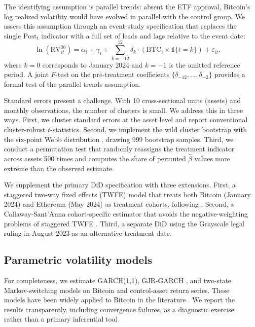 \documentclass[12pt,a4paper]{article}
\begin{document}
The identifying assumption is parallel trends: absent the ETF approval,
Bitcoin's log realized volatility would have evolved in parallel with the
control group. We assess this assumption through an event-study
specification that replaces the single $\text{Post}_t$ indicator with a
full set of leads and lags relative to the event date:
\begin{equation}\label{eq:eventstudy}
  \ln(\text{RV}^{30}_{it}) = \alpha_i + \gamma_t + \sum_{k=-12}^{12}
  \delta_k \cdot (\text{BTC}_i \times \mathbb{1}\{t = k\}) + \varepsilon_{it},
\end{equation}
where $k = 0$ corresponds to January 2024 and $k = -1$ is the omitted
reference period. A joint $F$-test on the pre-treatment coefficients
$\{\delta_{-12}, \ldots, \delta_{-2}\}$ provides a formal test of the
parallel trends assumption.

Standard errors present a challenge. With 10 cross-sectional units (assets)
and monthly observations, the number of clusters is small. We address this
in three ways. First, we cluster standard errors at the asset level and
report conventional cluster-robust $t$-statistics. Second, we implement
the wild cluster bootstrap with the six-point Webb distribution
\citep{cameron2008bootstrap, webb2022wild}, drawing 999 bootstrap samples.
Third, we conduct a permutation test that randomly reassigns the treatment
indicator across assets 500 times and computes the share of permuted
$\hat{\beta}$ values more extreme than the observed estimate.

We supplement the primary DiD specification with three extensions. First, a
staggered two-way fixed effects (TWFE) model that treats both Bitcoin
(January 2024) and Ethereum (May 2024) as treatment cohorts, following
\citet{goodmanbacon2021difference}. Second, a Callaway-Sant'Anna
cohort-specific estimator that avoids the negative-weighting problems of
staggered TWFE \citep{callaway2021difference}. Third, a separate DiD using
the Grayscale legal ruling in August 2023 as an alternative treatment date.

\subsection{Parametric volatility models}\label{sec:meth-garch}

For completeness, we estimate GARCH(1,1), GJR-GARCH \citep{glosten1993relation},
and two-state Markov-switching \citep{hamilton1989new} models on Bitcoin
and control-asset return series. These models have been widely applied to
Bitcoin in the literature \citep{katsiampa2017volatility,
ardia2019regime, caporale2019modelling, chkili2021regime}. We report the
results transparently, including convergence failures, as a diagnostic
exercise rather than a primary inferential tool.
\end{document}
